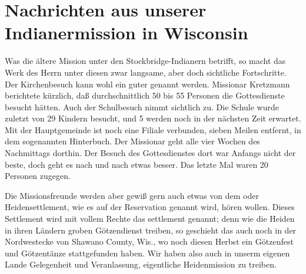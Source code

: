\chapter[Nachrichten aus unserer Indianermission]{Nachrichten aus unserer Indianermission in Wisconsin}

Was die ältere Mission unter den Stockbridge-Indianern betrifft, so macht das Werk des Herrn unter diesen zwar langsame, aber doch sichtliche Fortschritte. Der Kirchenbesuch kann wohl ein guter genannt werden. Missionar Kretzmann berichtete kürzlich, daß durchschnittlich 50 bis 55 Personen die Gottesdienste besucht hätten. Auch der Schulbesuch nimmt sichtlich zu. Die Schule wurde zuletzt von 29 Kindern besucht, und 5 werden noch in der nächsten Zeit erwartet. Mit der Hauptgemeinde ist noch eine Filiale verbunden, sieben Meilen entfernt, in dem sogenannten Hinterbuch. Der Missionar geht alle vier Wochen des Nachmittags dorthin. Der Besuch des Gottesdienstes dort war Anfangs nicht der beste, doch geht es nach und nach etwas besser. Das letzte Mal waren 20 Personen zugegen.

Die Missionsfreunde werden aber gewiß gern auch etwas von dem  oder Heidensettlement, wie es auf der Reservation genannt wird, hören wollen. Dieses Settlement wird mit vollem Rechte das settlement genannt; denn wie die Heiden in ihren Ländern groben Götzendienst treiben, so geschieht das auch noch in der Nordwestecke von Shawano County, Wis., wo noch diesen Herbst ein Götzenfest und Götzentänze stattgefunden haben. Wir haben also auch in unserm
eigenen Lande Gelegenheit und Veranlassung, eigentliche Heidenmission zu treiben.


